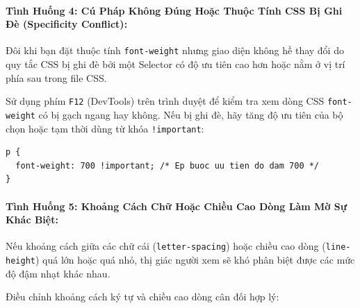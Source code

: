 \documentclass[11pt,oneside]{book}
\newcommand{\codeinline}[1]{\textcolor{accentOrange}{\texttt{#1}}}
\begin{document}
\paragraph{Tình Huống 4: Cú Pháp Không Đúng Hoặc Thuộc Tính CSS Bị Ghi Đè (Specificity Conflict):}

\begin{conceptBox}
Đôi khi bạn đặt thuộc tính \codeinline{font-weight} nhưng giao diện không hề thay đổi do quy tắc CSS bị ghi đè bởi một Selector có độ ưu tiên cao hơn hoặc nằm ở vị trí phía sau trong file CSS.
\end{conceptBox}

\begin{tipBox}
Sử dụng phím \codeinline{F12} (DevTools) trên trình duyệt để kiểm tra xem dòng CSS \codeinline{font-weight} có bị gạch ngang hay không. Nếu bị ghi đè, hãy tăng độ ưu tiên của bộ chọn hoặc tạm thời dùng từ khóa \codeinline{!important}:
\end{tipBox}

\begin{codeWindow}
\begin{lstlisting}[language=CSS3]
p {
  font-weight: 700 !important; /* Ep buoc uu tien do dam 700 */
}
\end{lstlisting}
\end{codeWindow}

\paragraph{Tình Huống 5: Khoảng Cách Chữ Hoặc Chiều Cao Dòng Làm Mờ Sự Khác Biệt:}

\begin{conceptBox}
Nếu khoảng cách giữa các chữ cái (\codeinline{letter-spacing}) hoặc chiều cao dòng (\codeinline{line-height}) quá lớn hoặc quá nhỏ, thị giác người xem sẽ khó phân biệt được các mức độ đậm nhạt khác nhau.
\end{conceptBox}

\begin{tipBox}
Điều chỉnh khoảng cách ký tự và chiều cao dòng cân đối hợp lý:
\end{tipBox}
\end{document}
